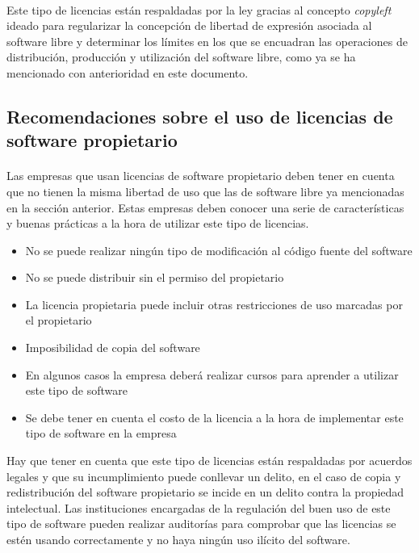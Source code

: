 \documentclass[10pt]{article}
\begin{document}
		\paragraph{}
        Este tipo de licencias están respaldadas por la ley gracias al concepto \textit{copyleft} ideado para regularizar la concepción de libertad de expresión asociada al software libre y determinar los límites en los que se encuadran las operaciones de distribución, producción y utilización del software libre, como ya se ha mencionado con anterioridad en este documento.
        
        \subsection{Recomendaciones sobre el uso de licencias de software propietario}
        \paragraph{}
        Las empresas que usan licencias de software propietario deben tener en cuenta que no tienen la misma libertad de uso que las de software libre ya mencionadas en la sección anterior. Estas empresas deben conocer una serie de características y buenas prácticas a la hora de utilizar este tipo de licencias.
        \begin{itemize}
        \item No se puede realizar ningún tipo de modificación al código fuente del software
        \item No se puede distribuir sin el permiso del propietario
        \item La licencia propietaria puede incluir otras restricciones de uso marcadas por el propietario
        \item Imposibilidad de copia del software
        \item En algunos casos la empresa deberá realizar cursos para aprender a utilizar este tipo de software
        \item Se debe tener en cuenta el costo de la licencia a la hora de implementar este tipo de software en la empresa
        \end{itemize}
        Hay que tener en cuenta que este tipo de licencias están respaldadas por acuerdos legales y que su incumplimiento puede conllevar un delito, en el caso de copia y redistribución del software propietario se incide en un delito contra la propiedad intelectual. Las instituciones encargadas de la regulación del buen uso de este tipo de software pueden realizar auditorías para comprobar que las licencias se estén usando correctamente y no haya ningún uso ilícito del software.
        
\end{document}
